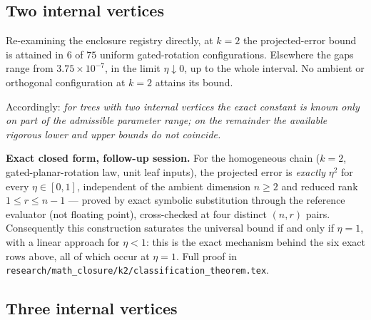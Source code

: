 \documentclass[11pt]{amsart}
\theoremstyle{definition}
\theoremstyle{remark}
\begin{document}
\begin{table}[t]
\centering\small
\caption{Outcome of comparing the interval-enclosed lower construction with the proved
upper bound, by error type. \emph{Determined}: the two bounds coincide at a positive
value. \emph{Zero}: the proved upper bound is itself zero, so the constant vanishes as an
immediate consequence of Theorem~\ref{thm:homogeneous}. \emph{Partial}: a positive lower
bound was obtained that does not meet the upper bound. \emph{None}: no positive lower
bound was obtained, so the only lower bound available is the trivial one implied by
nonnegativity. The four columns are mutually exclusive and sum to the configuration
count.}
\label{tab:gaps}

\end{table}

\subsection{Two internal vertices}

Re-examining the enclosure registry directly, at $k=2$ the projected-error bound is
attained in $6$ of $75$ uniform gated-rotation configurations. Elsewhere the gaps range
from $3.75\times10^{-7}$, in the limit $\eta\downarrow0$, up to the whole interval. No
ambient or orthogonal configuration at $k=2$ attains its bound.

Accordingly: \emph{for trees with two internal vertices the exact constant is known only
on part of the admissible parameter range; on the remainder the available rigorous lower
and upper bounds do not coincide.}

\textbf{Exact closed form, follow-up session.} For the homogeneous chain
($k=2$, gated-planar-rotation law, unit leaf inputs), the projected error is
\emph{exactly} $\eta^2$ for every $\eta\in[0,1]$, independent of the ambient
dimension $n\ge2$ and reduced rank $1\le r\le n-1$ --- proved by exact symbolic
substitution through the reference evaluator (not floating point), cross-checked at
four distinct $(n,r)$ pairs. Consequently this construction saturates the universal
bound if and only if $\eta=1$, with a linear approach for $\eta<1$: this is the exact
mechanism behind the six exact rows above, all of which occur at $\eta=1$. Full proof
in \texttt{research/math\_closure/k2/classification\_theorem.tex}.

\subsection{Three internal vertices}
\end{document}
